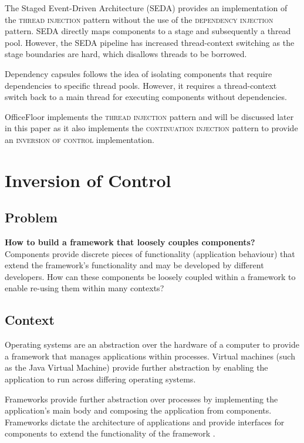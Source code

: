\documentclass[prodmode]{style/acmlarge}
\begin{document}
The Staged Event-Driven Architecture (SEDA) \cite{seda} provides an
implementation of the \textsc{thread injection} pattern without the use of the
\textsc{dependency injection} pattern.  SEDA directly maps components to a stage
and subsequently a thread pool.  However, the SEDA pipeline has increased
thread-context switching as the stage boundaries are hard, which disallows
threads to be borrowed.

Dependency capsules \cite{dependency-capsules} follows the idea of isolating
components that require dependencies to specific thread pools.  However, it
requires a thread-context switch back to a main thread for executing components
without dependencies.

OfficeFloor \cite{officefloor} implements the \textsc{thread injection} pattern
and will be discussed later in this paper as it also implements the
\textsc{continuation injection} pattern to provide an \textsc{inversion of control}
implementation.



\section{Inversion of Control}


\subsection{Problem}

\textbf{How to build a framework that loosely couples components?} Components
provide discrete pieces of functionality (application behaviour) that extend the
framework's functionality and may be developed by different developers.  How can
these components be loosely coupled within a framework to enable re-using them
within many contexts?


\subsection{Context}

Operating systems are an abstraction over the hardware of a computer to
provide a framework that manages applications within processes.  Virtual
machines (such as the Java Virtual Machine) provide further abstraction by
enabling the application to run across differing operating systems.

Frameworks provide further abstraction over processes by implementing the
application's main body and composing the application from components. 
Frameworks dictate the architecture of applications and provide interfaces for
components to extend the functionality of the framework \cite{gof}.
\end{document}

